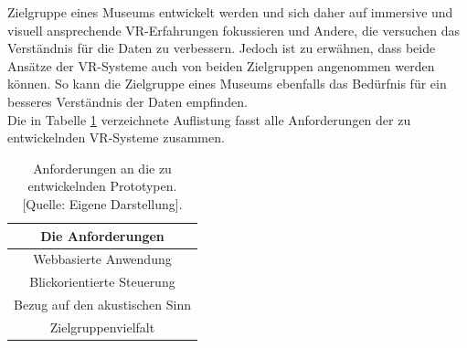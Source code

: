 \documentclass[a4paper,12pt,oneside]{article}
\begin{document}
      Zielgruppe eines Museums entwickelt werden und sich daher auf immersive 
      und visuell ansprechende VR-Erfahrungen fokussieren 
      und Andere, die versuchen das Verständnis für die Daten zu verbessern. 
      Jedoch ist zu erwähnen, dass beide Ansätze der VR-Systeme auch von
      beiden Zielgruppen angenommen werden können. So kann die Zielgruppe eines Museums 
      ebenfalls das Bedürfnis für ein besseres Verständnis der Daten empfinden. \\
      Die in Tabelle \ref{tab:anforderungen} verzeichnete Auflistung fasst
      alle Anforderungen der zu entwickelnden VR-Systeme zusammen.
      \begin{table}[h]
        \begin{center}
          \begin{tabular}{| c |}
            \hline
            \textbf{Die Anforderungen} \\ \hline
            Webbasierte Anwendung \\ \hline
            Blickorientierte Steuerung \\ \hline
            Bezug auf den akustischen Sinn \\ \hline
            Zielgruppenvielfalt \\ \hline
          \end{tabular}
          \caption[Anforderungen an die zu entwickelnden Prototypen.]{Anforderungen an die zu entwickelnden Prototypen. [Quelle: Eigene Darstellung].\label{tab:anforderungen}}
        \end{center}
      \end{table}
\end{document}
